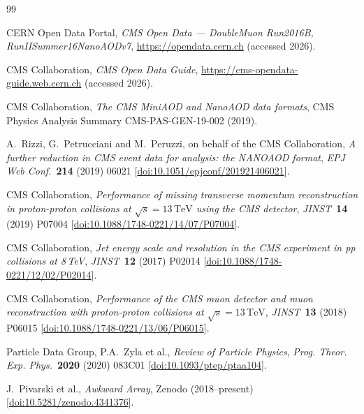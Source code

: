 \documentclass[a4paper,11pt]{article}
\begin{document}
\begin{thebibliography}{99}

  CERN Open Data Portal,
  \emph{CMS Open Data --- DoubleMuon Run2016B, RunIISummer16NanoAODv7},
  \url{https://opendata.cern.ch} (accessed 2026).

  CMS Collaboration,
  \emph{CMS Open Data Guide},
  \url{https://cms-opendata-guide.web.cern.ch} (accessed 2026).

  CMS Collaboration,
  \emph{The CMS MiniAOD and NanoAOD data formats},
  CMS Physics Analysis Summary CMS-PAS-GEN-19-002 (2019).

  A.~Rizzi, G.~Petrucciani and M.~Peruzzi,
  on behalf of the CMS Collaboration,
  \emph{A further reduction in CMS event data for analysis: the NANOAOD
    format},
  \emph{EPJ Web Conf.}~\textbf{214} (2019) 06021
  [\href{https://doi.org/10.1051/epjconf/201921406021}{doi:10.1051/epjconf/201921406021}].

  CMS Collaboration,
  \emph{Performance of missing transverse momentum reconstruction in
    proton-proton collisions at $\sqrt{s} = 13\,\mathrm{TeV}$ using the
    CMS detector},
  \emph{JINST}~\textbf{14} (2019) P07004
  [\href{https://doi.org/10.1088/1748-0221/14/07/P07004}{doi:10.1088/1748-0221/14/07/P07004}].

  CMS Collaboration,
  \emph{Jet energy scale and resolution in the CMS experiment in pp
    collisions at 8\,TeV},
  \emph{JINST}~\textbf{12} (2017) P02014
  [\href{https://doi.org/10.1088/1748-0221/12/02/P02014}{doi:10.1088/1748-0221/12/02/P02014}].

  CMS Collaboration,
  \emph{Performance of the CMS muon detector and muon reconstruction with
    proton-proton collisions at $\sqrt{s} = 13\,\mathrm{TeV}$},
  \emph{JINST}~\textbf{13} (2018) P06015
  [\href{https://doi.org/10.1088/1748-0221/13/06/P06015}{doi:10.1088/1748-0221/13/06/P06015}].

  Particle Data Group, P.A.~Zyla et al.,
  \emph{Review of Particle Physics},
  \emph{Prog. Theor. Exp. Phys.}~\textbf{2020} (2020) 083C01
  [\href{https://doi.org/10.1093/ptep/ptaa104}{doi:10.1093/ptep/ptaa104}].

  J.~Pivarski et al.,
  \emph{Awkward Array},
  Zenodo (2018--present)
  [\href{https://doi.org/10.5281/zenodo.4341376}{doi:10.5281/zenodo.4341376}].


\end{thebibliography}
\end{document}
